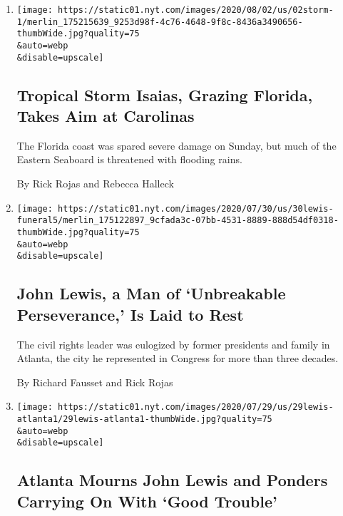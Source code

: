 \begin{enumerate}
\def\labelenumi{\arabic{enumi}.}
\item
  \href{/2020/08/02/us/tropical-storm-isaias-florida-carolina.html}{}

  \texttt{[image: https://static01.nyt.com/images/2020/08/02/us/02storm-1/merlin\_175215639\_9253d98f-4c76-4648-9f8c-8436a3490656-thumbWide.jpg?quality=75\\\&auto=webp\\\&disable=upscale]}

  \hypertarget{tropical-storm-isaias-grazing-florida-takes-aim-at-carolinas}{%
  \subsection{Tropical Storm Isaias, Grazing Florida, Takes Aim at
  Carolinas}\label{tropical-storm-isaias-grazing-florida-takes-aim-at-carolinas}}

  The Florida coast was spared severe damage on Sunday, but much of the
  Eastern Seaboard is threatened with flooding rains.

  By Rick Rojas and Rebecca Halleck
\item
  \href{/2020/07/30/us/john-lewis-live-funeral.html}{}

  \texttt{[image: https://static01.nyt.com/images/2020/07/30/us/30lewis-funeral5/merlin\_175122897\_9cfada3c-07bb-4531-8889-888d54df0318-thumbWide.jpg?quality=75\\\&auto=webp\\\&disable=upscale]}

  \hypertarget{john-lewis-a-man-of-unbreakable-perseverance-is-laid-to-rest}{%
  \subsection{John Lewis, a Man of `Unbreakable Perseverance,' Is Laid
  to
  Rest}\label{john-lewis-a-man-of-unbreakable-perseverance-is-laid-to-rest}}

  The civil rights leader was eulogized by former presidents and family
  in Atlanta, the city he represented in Congress for more than three
  decades.

  By Richard Fausset and Rick Rojas
\item
  \href{/2020/07/29/us/john-lewis-atlanta-memorial.html}{}

  \texttt{[image: https://static01.nyt.com/images/2020/07/29/us/29lewis-atlanta1/29lewis-atlanta1-thumbWide.jpg?quality=75\\\&auto=webp\\\&disable=upscale]}

  \hypertarget{atlanta-mourns-john-lewis-and-ponders-carrying-on-with-good-trouble}{%
  \subsection{Atlanta Mourns John Lewis and Ponders Carrying On With
  `Good
  Trouble'}\label{atlanta-mourns-john-lewis-and-ponders-carrying-on-with-good-trouble}}


\end{enumerate}
